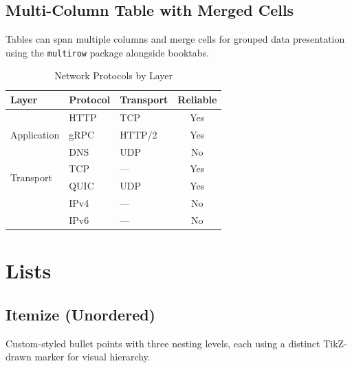 \documentclass[12pt]{article}
\newcommand{\rowcolorhead}{\rowcolor{tableHead}}   %
\newcommand{\rowcoloralt}{\rowcolor{tableAlt}}      %
\begin{document}
\subsection{Multi-Column Table with Merged Cells}
Tables can span multiple columns and merge cells for grouped data presentation
using the \texttt{multirow} package alongside booktabs.

\vspace{4pt}
\begin{table}[h]
\centering
\caption{Network Protocols by Layer}
\begin{tabular}{@{} l l l c @{}}
\toprule
\rowcolorhead
\textcolor{tableHeadText}{\textbf{Layer}} &
\textcolor{tableHeadText}{\textbf{Protocol}} &
\textcolor{tableHeadText}{\textbf{Transport}} &
\textcolor{tableHeadText}{\textbf{Reliable}} \\
\midrule
\multirow{3}{*}{Application} & HTTP  & TCP & Yes \\
\rowcoloralt
                           & gRPC  & HTTP/2 & Yes \\
                           & DNS   & UDP & No  \\
\midrule
\multirow{2}{*}{Transport}  & TCP   & ---  & Yes \\
\rowcoloralt
                           & QUIC  & UDP  & Yes \\
\midrule
\rowcoloralt
\multirow{2}{*}{Network}    & IPv4  & ---  & No  \\
                           & IPv6  & ---  & No  \\
\bottomrule
\end{tabular}
\end{table}

\section{Lists}

\subsection{Itemize (Unordered)}
Custom-styled bullet points with three nesting levels, each using
a distinct TikZ-drawn marker for visual hierarchy.
\end{document}
